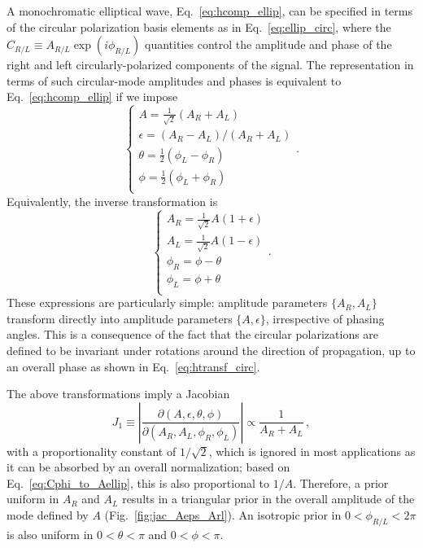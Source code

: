 \documentclass[aps,prd,twocolumn,superscriptaddress,preprintnumbers,floatfix,nofootinbib]{revtex4-2}
\newcommand*{\eq}[1]{Eq.~\eqref{eq:#1}}
\begin{document}
A monochromatic elliptical wave, Eq.~\eqref{eq:hcomp_ellip}, can be specified in terms of the circular polarization basis elements as in \eq{ellip_circ},
where the $C_{R/L} \equiv A_{R/L} \exp(i\phi_{R/L})$ quantities control the amplitude and phase of the right and left circularly-polarized components of the signal.
%
The representation in terms of such circular-mode amplitudes and phases is equivalent to Eq.~\eqref{eq:hcomp_ellip} if we impose
\begin{equation} \label{eq:Cphi_to_Aellip}
\begin{cases}
A = \frac{1}{\sqrt{2}}\left(A_R + A_L\right) \\
\epsilon = (A_R - A_L)/(A_R + A_L) \\ 
\theta = \frac{1}{2}(\phi_L - \phi_R)\\
\phi = \frac{1}{2}(\phi_L + \phi_R)\\
\end{cases} .
\end{equation}
Equivalently, the inverse transformation is 
\begin{equation} \label{eq:Aellip_to_Cphi}
\begin{cases}
A_R = \frac{1}{\sqrt{2}} A \left(1 + \epsilon\right) \\
A_L = \frac{1}{\sqrt{2}} A \left(1 - \epsilon\right) \\
\phi_R = \phi - \theta \\ 
\phi_L = \phi + \theta \\ 
\end{cases} .
\end{equation}
These expressions are particularly simple: amplitude parameters $\{ A_R, A_L\}$ transform directly into amplitude parameters $\{A, \epsilon\}$, irrespective of phasing angles.
This is a consequence of the fact that the circular polarizations are defined to be invariant under rotations around the direction of propagation, up to an overall phase as shown in \eq{htransf_circ}.

The above transformations imply a Jacobian
\begin{equation} \label{eq:jac_Aeps_Arl}
J_1 \equiv \left| \frac{\partial(A,\epsilon,\theta,\phi)}{\partial(A_R, A_L, \phi_R, \phi_L)}\right| \propto \frac{1}{A_R + A_L}\, ,
\end{equation}
with a proportionality constant of $1/\sqrt{2}$, which is ignored in most applications as it can be absorbed by an overall normalization; based on \eq{Cphi_to_Aellip}, this is also proportional to $1/A$.
Therefore, a prior uniform in $A_R$ and $A_L$ results in a triangular prior in the overall amplitude of the mode defined by $A$ (Fig.~\ref{fig:jac_Aeps_Arl}).
An isotropic prior in $0 < \phi_{R/L} < 2\pi$ is also uniform in $0 < \theta <\pi$ and $0 < \phi <\pi$.
\end{document}
